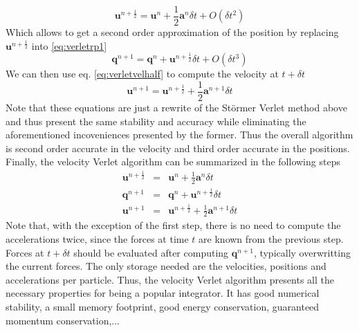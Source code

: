 \documentclass[ twoside,openright,titlepage,numbers=noenddot,%
headinclude,footinclude,cleardoublepage=empty,abstract=on,
BCOR=5mm,paper=a4,fontsize=11pt, dvipsnames
]{scrreprt}
\renewcommand{\vec}[1]{\bm{#1}}
\newcommand{\dt}{\delta t}
\newcommand{\half}{\frac{1}{2}}
\newcommand{\ppos}{q}
\newcommand{\pvel}{u}
\begin{document}
\begin{equation}
  \label{eq:verletvelhalf}
  \vec{\pvel}^{n+\half} = \vec{\pvel}^n + \half\vec{a}^n\dt + O(\dt^2)
\end{equation}
Which allows to get a second order approximation of the position by replacing  $\vec{\pvel}^{n+\half}$ into \eqref{eq:verletrp1}
\begin{equation}
  \vec{\ppos}^{n+1} = \vec{\ppos}^n +  \vec{\pvel}^{n+\half}\dt + O(\dt^3)
\end{equation}
We can then use eq. \eqref{eq:verletvelhalf} to compute the velocity at $t+\dt$
\begin{equation}
  \vec{\pvel}^{n+1} = \vec{\pvel}^{n+\half} + \half\vec{a}^{n+1}\dt
\end{equation}
Note that these equations are just a rewrite of the Störmer Verlet method above and thus present the same stability and accuracy while eliminating the aforementioned incoveniences presented by the former.
Thus the overall algorithm is second order accurate in the velocity and third order accurate in the positions.
Finally, the velocity Verlet algorithm can be summarized in the following steps
\begin{equation}
  \label{eq:verletnve}
  \begin{aligned}
    \vec{\pvel}^{n+\half} &=& \vec{\pvel}^n + \half \vec{a}^n\dt\\
  \vec{\ppos}^{n+1} &=& \vec{\ppos}^n +  \vec{\pvel}^{n+\half}\dt\\
  \vec{\pvel}^{n+1} &=& \vec{\pvel}^{n+\half} + \half\vec{a}^{n+1}\dt
\end{aligned}
\end{equation}
Note that, with the exception of the first step, there is no need to compute the accelerations twice, since the forces at time $t$ are known from the previous step. Forces at $t+\dt$ should be evaluated after computing $\vec{\ppos}^{n+1}$, typically overwritting the current forces. The only storage needed are the velocities, positions and accelerations per particle.
Thus, the velocity Verlet algorithm presents all the necessary properties for being a popular integrator. It has good numerical stability, a small memory footprint, good energy conservation, guaranteed momentum conservation,...

%
\end{document}
